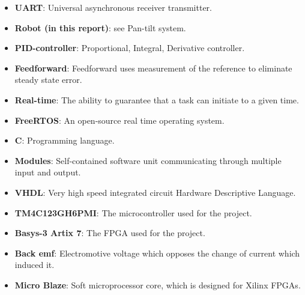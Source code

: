 \documentclass[../../main.tex]{subfiles}
\begin{document}
\begin{itemize}
    
    \item \textbf{UART}: Universal asynchronous receiver transmitter.
    \item \textbf{Robot (in this report)}: see Pan-tilt system.
    
    \item \textbf{PID-controller}: Proportional, Integral, Derivative controller.
    \item \textbf{Feedforward}: Feedforward uses measurement of the reference to eliminate steady state error.
    \item \textbf{Real-time}: The ability to guarantee that a task can initiate to a given time.
    \item \textbf{FreeRTOS}: An open-source real time operating system.
    \item \textbf{C}: Programming language. 
    \item \textbf{Modules}: Self-contained software unit communicating through multiple input and output.
    \item \textbf{VHDL}: Very high speed integrated circuit Hardware Descriptive Language.
    
    \item \textbf{TM4C123GH6PMI}: The microcontroller used for the project.
    \item \textbf{Basys-3 Artix 7}: The FPGA used for the project.
    \item \textbf{Back emf}: Electromotive voltage which opposes the change of current which induced it. 
    \item \textbf{Micro Blaze}: Soft microprocessor core, which is designed for Xilinx FPGAs.
\end{itemize}
\end{document}
